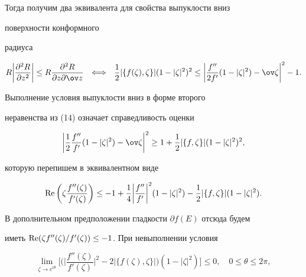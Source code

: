 


Тогда получим два эквивалента для свойства выпуклости вниз 


поверхности конформного 


радиуса 


\begin{equation} 


R\bigg|\frac{\partial^2R}{\partial z^2}\bigg|\le R 


\frac{\partial^2R}{\partial z\partial\ov z}\ \  


\Longleftrightarrow\ \ \frac{1}{2}|\{f(\zeta),\zeta\}| 


(1-|\zeta|^2)^2\le\bigg|\frac{f''}{2f'} 


(1-|\zeta|^2)-\ov\zeta\bigg|^2-1. 


\end{equation} 


 


Выполнение условия выпуклости вниз в форме второго 


неравенства из (14) означает справедливость оценки 


$$ 


\bigg|\frac{1}{2}\frac{f''}{f'}(1-|\zeta|^2)-\ov\zeta 


\bigg|^2\ge1+\frac{1}{2}|\{f,\zeta\}|(1-|\zeta|^2)^2, 


$$ 


которую перепишем в эквивалентном виде 


\begin{equation} 


\re\bigg(\zeta\frac{f''(\zeta)}{f'(\zeta)} \bigg)\le 


-1+\frac{1}{4}\bigg|\frac{f''}{f'}\bigg|^2 


(1-|\zeta|^2)-\frac{1}{2}|\{f,\zeta\}|(1-|\zeta|^2). 


\end{equation} 


В дополнительном предположении гладкости $\partial f(E)$ отсюда будем 


иметь $\operatorname{Re}(\zeta f''(\zeta)/f'(\zeta))\le-1$. При невыполнении условия 


$$ 


\lim_{\zeta\to e^{i\theta}}\bigg[\bigg(\bigg| 


\frac{f''(\zeta)}{f'(\zeta)}\bigg|^2-2|\{f(\zeta),\zeta\}| 


\bigg)(1-|\zeta|^2)\bigg]\le0,\quad 0\le\theta\le2\pi, 


$$ 


